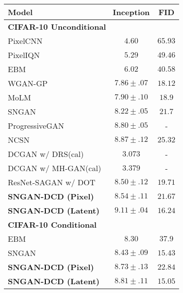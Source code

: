 \documentclass{article}
\begin{document}
\begin{figure*}[t]
\begin{minipage}{0.55\textwidth}
\begin{center}
\begin{adjustbox}{max width=.9\linewidth}
\begin{tabular}{lcc}
        \toprule
        Model & Inception & FID\\
        \midrule
        \multicolumn{3}{l}{\textbf{CIFAR-10 Unconditional}} \\
        \midrule
        PixelCNN~\cite{van2016conditional} & $4.60$ & $65.93$\\
        PixelIQN~\cite{ostrovski2018autoregressive} & $5.29$ & $49.46$\\
        EBM~\cite{du2019implicit} & $6.02$ & $40.58$ \\
        WGAN-GP~\cite{gulrajani2017improved} & $7.86 \pm .07$ & $18.12$\\
        MoLM~\cite{ravuri2018learning} & $7.90\pm .10$ & $\mathbf{18.9}$\\
        SNGAN~\cite{miyato2018spectral} & $8.22\pm .05$ & $21.7$ \\
        ProgressiveGAN~\cite{karras2017progressive} & $8.80\pm .05$ & - \\
        NCSN~\cite{song2019generative} & {$8.87 \pm .12$} & $25.32$\\
        \midrule
DCGAN w/ DRS(cal)~\cite{azadi2018discriminator} & $3.073 $ & - \\
        DCGAN w/ MH-GAN(cal)~\cite{turner2018metropolis} & $3.379 $ & - \\
ResNet-SAGAN w/ DOT~\cite{tanaka2019discriminator} & $8.50 \pm .12$ & $19.71$\\
        \midrule
        \textbf{SNGAN-DCD (Pixel)} & {$8.54 \pm .11$} & $21.67$\\
        \textbf{SNGAN-DCD (Latent)} & {$\mathbf{9.11} \pm .04$} & $\mathbf{16.24}$\\
        \bottomrule
        \toprule
        \multicolumn{3}{l}{\textbf{CIFAR-10 Conditional}} \\
        \midrule
        EBM~\cite{du2019implicit} & $8.30$ & $37.9$ \\
        SNGAN~\cite{miyato2018spectral} & $8.43 \pm .09$ & $15.43$\\
        \textbf{SNGAN-DCD (Pixel)} & {$8.73 \pm .13$} & $22.84$\\
        \textbf{SNGAN-DCD (Latent)} & {$8.81 \pm .11$} & $15.05$\\

\end{tabular}
\end{adjustbox}
\end{center}
\end{minipage}
\end{figure*}
\end{document}
